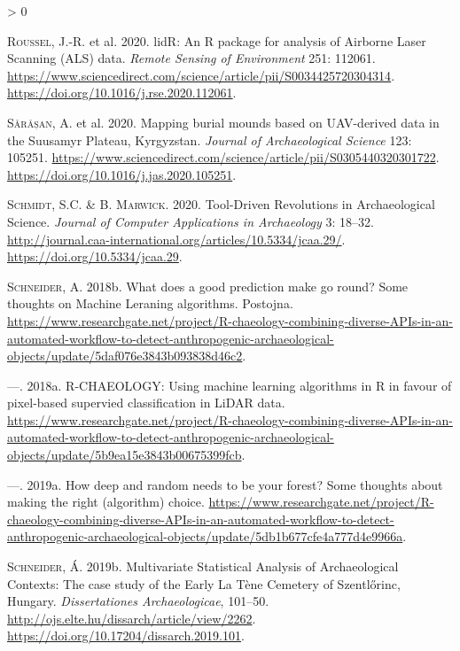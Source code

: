 \documentclass[
  12pt,
]{article}
\newlength{\cslhangindent}
\newenvironment{CSLReferences}[2] %
 {%
  \setlength{\parindent}{0pt}
  \ifodd #1 \everypar{\setlength{\hangindent}{\cslhangindent}}\ignorespaces\fi
  \ifnum #2 > 0
  \setlength{\parskip}{#2\baselineskip}
  \fi
 }%
 {}
\begin{document}
\begin{CSLReferences}{1}{0}
\leavevmode\hypertarget{ref-rousselLidRPackageAnalysis2020}{}%
\textsc{Roussel}, J.-R. et al. 2020. {lidR}: {An} {R} package for analysis of {Airborne} {Laser} {Scanning} ({ALS}) data. \emph{Remote Sensing of Environment} 251: 112061. \url{https://www.sciencedirect.com/science/article/pii/S0034425720304314}. \url{https://doi.org/10.1016/j.rse.2020.112061}.

\leavevmode\hypertarget{ref-sarasanMappingBurialMounds2020a}{}%
\textsc{Sărășan}, A. et al. 2020. Mapping burial mounds based on {UAV}-derived data in the {Suusamyr} {Plateau}, {Kyrgyzstan}. \emph{Journal of Archaeological Science} 123: 105251. \url{https://www.sciencedirect.com/science/article/pii/S0305440320301722}. \url{https://doi.org/10.1016/j.jas.2020.105251}.

\leavevmode\hypertarget{ref-schmidtToolDrivenRevolutionsArchaeological2020b}{}%
\textsc{Schmidt}, S.C. \& B. \textsc{Marwick}. 2020. Tool-{Driven} {Revolutions} in {Archaeological} {Science}. \emph{Journal of Computer Applications in Archaeology} 3: 18--32. \url{http://journal.caa-international.org/articles/10.5334/jcaa.29/}. \url{https://doi.org/10.5334/jcaa.29}.

\leavevmode\hypertarget{ref-schneiderWhatDoesGood2018}{}%
\textsc{Schneider}, A. 2018b. What does a good prediction make go round? {Some} thoughts on {Machine} {Leraning} algorithms. Postojna. \url{https://www.researchgate.net/project/R-chaeology-combining-diverse-APIs-in-an-automated-workflow-to-detect-anthropogenic-archaeological-objects/update/5daf076e3843b093838d46c2}.

\leavevmode\hypertarget{ref-schneiderRCHAEOLOGYUsingMachine2018}{}%
---. 2018a. R-{CHAEOLOGY}: Using machine learning algorithms in {R} in favour of pixel-based supervied classification in {LiDAR} data. \url{https://www.researchgate.net/project/R-chaeology-combining-diverse-APIs-in-an-automated-workflow-to-detect-anthropogenic-archaeological-objects/update/5b9ea15e3843b00675399fcb}.

\leavevmode\hypertarget{ref-schneiderHowDeepRandom2019}{}%
---. 2019a. How deep and random needs to be your forest? {Some} thoughts about making the right (algorithm) choice. \url{https://www.researchgate.net/project/R-chaeology-combining-diverse-APIs-in-an-automated-workflow-to-detect-anthropogenic-archaeological-objects/update/5db1b677cfe4a777d4e9966a}.

\leavevmode\hypertarget{ref-schneiderMultivariateStatisticalAnalysis2019}{}%
\textsc{Schneider}, Á. 2019b. Multivariate {Statistical} {Analysis} of {Archaeological} {Contexts}: {The} case study of the {Early} {La} {Tène} {Cemetery} of {Szentlőrinc}, {Hungary}. \emph{Dissertationes Archaeologicae}, 101--50. \url{http://ojs.elte.hu/dissarch/article/view/2262}. \url{https://doi.org/10.17204/dissarch.2019.101}.


\end{CSLReferences}
\end{document}
